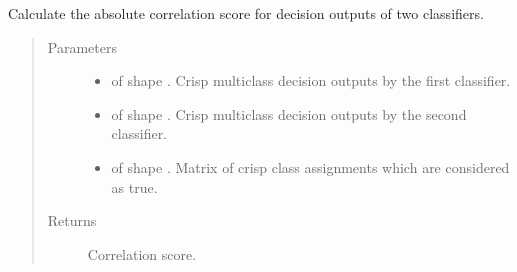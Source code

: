 \documentclass[letterpaper,10pt,english]{sphinxmanual}
\begin{document}
\begin{fulllineitems}
\label{\detokenize{pusion.evaluation.evaluation_metrics:pusion.evaluation.evaluation_metrics.abs_correlation}}
\sphinxAtStartPar
Calculate the absolute correlation score for decision outputs of two classifiers.
\begin{quote}\begin{description}
\item[{Parameters}] \leavevmode\begin{itemize}
\item {} 
\sphinxAtStartPar
{} \textendash{}  of shape .
Crisp multiclass decision outputs by the first classifier.

\item {} 
\sphinxAtStartPar
{} \textendash{}  of shape .
Crisp multiclass decision outputs by the second classifier.

\item {} 
\sphinxAtStartPar
{} \textendash{}  of shape .
Matrix of crisp class assignments which are considered as true.

\end{itemize}

\item[{Returns}] \leavevmode
\sphinxAtStartPar
Correlation score.

\end{description}\end{quote}

\end{fulllineitems}

\end{document}
